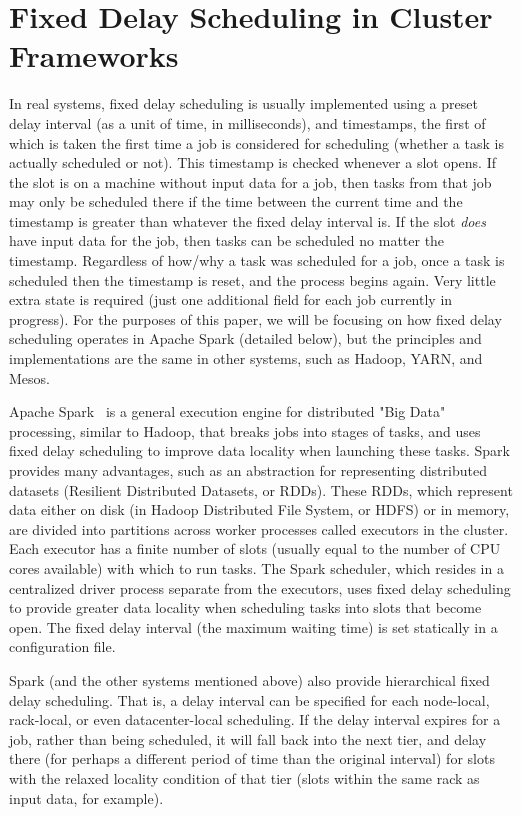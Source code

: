 \section{Fixed Delay Scheduling in Cluster Frameworks}\label{sec:systems}

In real systems, fixed delay scheduling is usually implemented using a preset delay 
interval (as a unit of time, in milliseconds), and timestamps, the first of
which is taken the first time a job is considered for scheduling (whether a task is actually
scheduled or not).
This timestamp is checked whenever a slot opens. If the slot is on a machine
without input data for a job, then tasks from that job may only be scheduled there if
the time between the current time and the timestamp is greater than whatever the fixed delay
interval is. If the slot \textit{does} have input data for the job, then tasks can be scheduled
no matter the timestamp. Regardless of how/why a task was scheduled for a job, once a task
is scheduled then the timestamp is reset, and the process begins again. Very little extra
state is required (just one additional field for each job currently in progress). For the purposes
of this paper, we will be focusing on how fixed delay scheduling operates in Apache Spark (detailed
below), but the principles and implementations are the same in other systems, such as 
Hadoop, YARN, and Mesos.

Apache Spark~\cite{Zaharia2012} is a general execution engine for distributed "Big Data" processing, 
similar to Hadoop, that breaks jobs into stages of tasks, and uses fixed delay scheduling to 
improve data locality when launching these tasks. Spark provides many advantages, such 
as an abstraction for representing distributed datasets (Resilient Distributed Datasets, 
or RDDs). These RDDs, which represent data either on disk (in Hadoop Distributed File 
System, or HDFS) or in memory, are divided into partitions across worker processes called 
executors in the cluster. Each executor has a finite number of slots (usually equal to the number 
of CPU cores available) with which to run 
tasks. The Spark scheduler, which resides in a centralized driver process separate from 
the executors, uses fixed delay scheduling to provide greater data locality when scheduling 
tasks into slots that become open. The fixed delay interval (the maximum waiting time) is set 
statically in a configuration file.

Spark (and the other systems mentioned above) also provide hierarchical fixed delay scheduling.
That is, a delay interval can be specified for each node-local, rack-local, or even datacenter-local
scheduling. If the delay interval expires for a job, rather than being scheduled, it will fall back
into the next tier, and delay there (for perhaps a different period of time than the original interval)
for slots with the relaxed locality condition of that tier (slots within the same rack as input data, for
example). 


